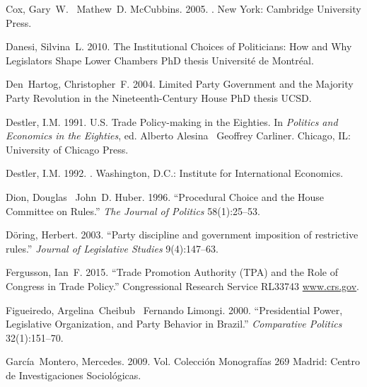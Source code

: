 \documentclass[letter,12pt]{article}
\begin{document}
\begin{thebibliography}{xx}
Cox, Gary~W. \harvardand\ Mathew~D. McCubbins. 2005.
.
\newblock New York:  Cambridge University Press.

Danesi, Silvina~L. 2010.
\newblock The Institutional Choices of Politicians: How and Why Legislators
  Shape Lower Chambers PhD thesis Universit\'e de Montr\'eal.

Den~Hartog, Christopher~F. 2004.
\newblock Limited Party Government and the Majority Party Revolution in the
  Nineteenth-Century {H}ouse PhD thesis UCSD.

Destler, I.M. 1991.
\newblock U.S. Trade Policy-making in the Eighties.  In {\em Politics and
  Economics in the Eighties}, ed. Alberto Alesina \harvardand\ Geoffrey
  Carliner.
\newblock Chicago, IL:  University of Chicago Press.

Destler, I.M. 1992.
.
\newblock Washington, D.C.:  Institute for International Economics.

Dion, Douglas \harvardand\ John~D. Huber. 1996.
\newblock ``Procedural Choice and the {H}ouse Committee on Rules.'' {\em The
  Journal of Politics} 58(1):25--53.

D{\"o}ring, Herbert. 2003.
\newblock ``Party discipline and government imposition of restrictive rules.''
  {\em Journal of Legislative Studies} 9(4):147--63.

Fergusson, Ian~F. 2015.
\newblock ``Trade Promotion Authority (TPA) and the Role of Congress in Trade
  Policy.'' Congressional Research Service RL33743 \url{www.crs.gov}.

Figueiredo, Argelina~Cheibub \harvardand\ Fernando Limongi. 2000.
\newblock ``Presidential Power, Legislative Organization, and Party Behavior in
  Brazil.'' {\em Comparative Politics} 32(1):151--70.

Garc\'ia~Montero, Mercedes. 2009.
\newblock Vol. Colecci\'on Monograf\'ias 269 Madrid:  Centro de Investigaciones
  Sociol\'ogicas.


\end{thebibliography}
\end{document}
